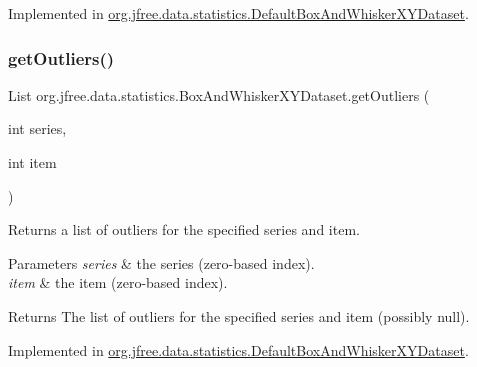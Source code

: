 Implemented in \mbox{\hyperlink{classorg_1_1jfree_1_1data_1_1statistics_1_1_default_box_and_whisker_x_y_dataset_ac47213bfcf3d3a0069a096077ea77531}{org.\+jfree.\+data.\+statistics.\+Default\+Box\+And\+Whisker\+X\+Y\+Dataset}}.

\mbox{\label{interfaceorg_1_1jfree_1_1data_1_1statistics_1_1_box_and_whisker_x_y_dataset_a7e0197e600e22c92f3201edc841aca0b}} 
\subsubsection{\texorpdfstring{get\+Outliers()}{getOutliers()}}
{\footnotesize\ttfamily List org.\+jfree.\+data.\+statistics.\+Box\+And\+Whisker\+X\+Y\+Dataset.\+get\+Outliers (\begin{DoxyParamCaption}\item[{int}]{series,  }\item[{int}]{item }\end{DoxyParamCaption})}

Returns a list of outliers for the specified series and item.


\begin{DoxyParams}{Parameters}
{\em series} & the series (zero-\/based index). \\
\hline
{\em item} & the item (zero-\/based index).\\
\hline
\end{DoxyParams}
\begin{DoxyReturn}{Returns}
The list of outliers for the specified series and item (possibly {\ttfamily null}). 
\end{DoxyReturn}


Implemented in \mbox{\hyperlink{classorg_1_1jfree_1_1data_1_1statistics_1_1_default_box_and_whisker_x_y_dataset_af17fd8f346542c9633d159bdcc543f57}{org.\+jfree.\+data.\+statistics.\+Default\+Box\+And\+Whisker\+X\+Y\+Dataset}}.

\mbox{\label{interfaceorg_1_1jfree_1_1data_1_1statistics_1_1_box_and_whisker_x_y_dataset_a9594fa74639e0dde5c4464db4de1e65a}} 
